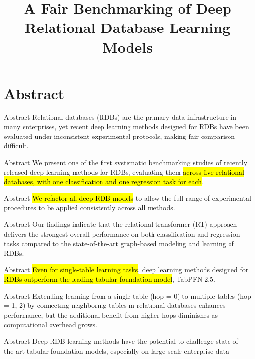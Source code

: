 \documentclass[aspectratio=169,10pt]{beamer}
\title{A Fair Benchmarking of Deep Relational Database Learning Models}
\subtitle{}
\author{\cit{Akhter, Samad, Ajendla '26}}
\date{}
\begin{document}
\maketitle

\section{Abstract}

\begin{frame}{Abstract}
Relational databases (RDBs) are the primary data infrastructure in many enterprises, yet recent deep learning methods designed for RDBs have been evaluated under inconsistent experimental protocols, making fair comparison difficult.
\end{frame}

\begin{frame}{Abstract}
We present one of the first systematic benchmarking studies of recently released deep learning methods for RDBs, evaluating them \hl{across five relational databases, with one classification and one regression task for each}.
\end{frame}

\begin{frame}{Abstract}
\hl{We refactor all deep RDB models} to allow the full range of experimental procedures to be applied consistently across all methods.
\end{frame}

\begin{frame}{Abstract}
Our findings indicate that the relational transformer (RT) approach delivers the strongest overall performance on both classification and regression tasks compared to the state-of-the-art graph-based modeling and learning of RDBs.
\end{frame}

\begin{frame}{Abstract}
\hl{Even for single-table learning tasks}, deep learning methods designed for \hl{RDBs outperform the leading tabular foundation model}, TabPFN 2.5.
\end{frame}

\begin{frame}{Abstract}
Extending learning from a single table (hop = 0) to multiple tables (hop = 1, 2) by connecting neighboring tables in relational databases enhances performance, but the additional benefit from higher hops diminishes as computational overhead grows.
\end{frame}

\begin{frame}{Abstract}
Deep RDB learning methods have the potential to challenge state-of-the-art tabular foundation models, especially on large-scale enterprise data.
\end{frame}
\end{document}
